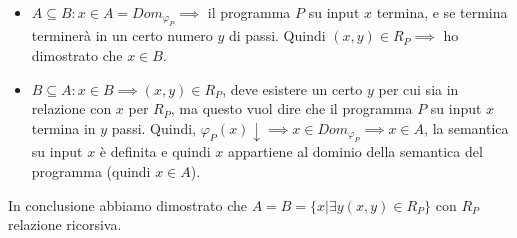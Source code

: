 \documentclass{article}
\begin{document}
\begin{itemize}
    \item $A\subseteq B: x\in A=Dom_{\varphi_P}\implies$ il programma $P$
          su input $x$ termina, e se termina terminerà in un certo numero $y$ di passi.
          Quindi $(x,y)\in R_P \implies$ ho dimostrato che $x\in B$.

    \item $B\subseteq A: x\in B\implies (x,y)\in R_P$, deve esistere un certo $y$ per cui
          sia in relazione con $x$ per $R_P$, ma questo vuol dire che il programma $P$
          su input $x$ termina in $y$ passi. Quindi, $\varphi_P(x)\downarrow\implies x\in Dom_{\varphi_P}\implies x\in A$,
          la semantica su input $x$ è definita e quindi $x$ appartiene al dominio della semantica del programma (quindi
          $x\in A$).
\end{itemize}
In conclusione abbiamo dimostrato che $A=B=\{x|\exists y(x,y)\in R_P\}$ con $R_P$ relazione ricorsiva.
\end{document}
